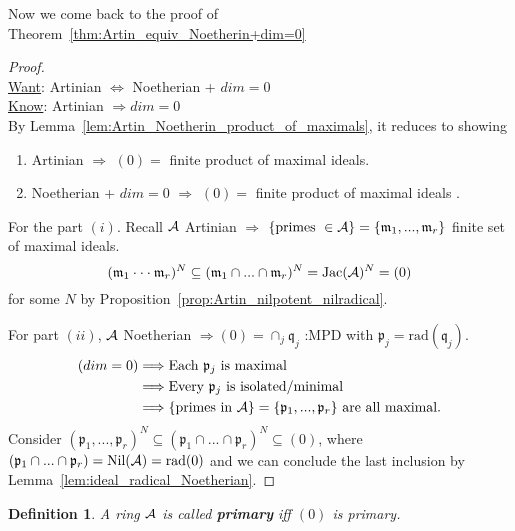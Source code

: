 \documentclass[11pt]{article}
\newtheorem{dfn}[thm]{Definition}
\newcommand{\scm}{{\mathfrak m}}
\newcommand{\scp}{{\mathfrak p}}
\newcommand{\scq}{\mathfrak q}
\newcommand{\cala}{{\cal A}}
\newcommand{\Lrta}{\Longrightarrow}
\newcommand{\Llrta}{\Longleftrightarrow}
\begin{document}
Now we come back to the proof of Theorem~\ref{thm:Artin_equiv_Noetherin+dim=0}
\begin{proof}\ \\
\underline{Want}: Artinian   $\Llrta $ Noetherian + $dim=0$\\
\underline{Know}: Artinian   $\Lrta dim=0$\\
By Lemma~\ref{lem:Artin_Noetherin_product_of_maximals}, it reduces to showing 
\begin{enumerate}[label=(\roman*)]
\item Artinian   $\Lrta $ $(0)=$ finite product of maximal ideals.
\item Noetherian + $dim=0$ $\Lrta $ $(0)=$ finite product of maximal ideals .
\end{enumerate}

For the part $(i)$. Recall $\cala$ Artinian   $\Lrta $ $\{\text{primes }\in \cala\}=\{\scm_1,...,\scm_r\}$ finite set of maximal ideals.
$$
(\scm_1\cdot \cdot \cdot \scm_r)^N\subseteq (\scm_1\cap ...\cap \scm_r)^N=\text{Jac}(\cala)^N=(0)
$$
for some $N$ by Proposition~\ref{prop:Artin_nilpotent_nilradical}.

For part $(ii)$, $\cala$ Noetherian $\Lrta (0)=\cap_j\scq_j$ :MPD with $\scp_j=\text{rad}(\scq_j)$.
$$
\begin{aligned}
(dim=0)& \Lrta\text{Each $\scp_j$ is maximal}\\
& \Lrta \text{Every $\scp_j$ is isolated/minimal}\\
& \Lrta \text{\{primes in $\cala$\}}=\{\scp_1,...,\scp_r\} \text{ are all maximal.}
\end{aligned}
$$
Consider $(\scp_1,...,\scp_r)^N\subseteq (\scp_1\cap...\cap\scp_r)^N\subseteq (0)$, where $(\scp_1\cap...\cap \scp_r)=\text{Nil}(  \cala)=\text{rad}(0)$ and we can conclude the last inclusion by Lemma~\ref{lem:ideal_radical_Noetherian}.
\end{proof}
\begin{dfn}
A ring $\cala$ is called \textbf{primary} iff $(0)$ is primary.
\end{dfn}
\end{document}
